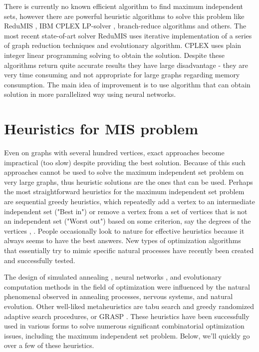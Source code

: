 There is currently no known efficient algorithm to find maximum independent sets, however there are powerful heuristic algorithms to solve this problem like ReduMIS \cite{redumis}, IBM CPLEX LP-solver \cite{CPLEX}, branch-reduce algorithms and others. The most recent state-of-art solver ReduMIS uses iterative implementation of a series of graph reduction techniques and evolutionary algorithm. CPLEX uses plain integer linear programming solving to obtain the solution. Despite these algorithms return quite accurate results they have large disadvantage - they are very time consuming and not appropriate for large graphs regarding memory consumption. 
The main idea of improvement is to use algorithm that can obtain solution in more parallelized way using neural networks.

\section{Heuristics for MIS problem}
Even on graphs with several hundred vertices, exact approaches become impractical (too slow) despite providing the best solution. Because of this such approaches cannot be used to solve the maximum independent set problem on very large graphs, thus heuristic solutions are the ones that can be used.
Perhaps the most straightforward heuristics for the maximum independent set problem are sequential greedy heuristics, which repeatedly add a vertex to an intermediate independent set ("Best in") or remove a vertex from a set of vertices that is not an independent set ("Worst out") based on some criterion, say the degrees of the vertices \cite{j74}, \cite{kr87}.
People occasionally look to nature for effective heuristics because it always seems to have the best answers. New types of optimization algorithms that essentially try to mimic specific natural processes have recently been created and successfully tested.

The design of simulated annealing \cite{kgv83}, neural networks \cite{h82}, and evolutionary computation \cite{h75} methods in the field of optimization were influenced by the natural phenomenal observed in annealing processes, nervous systems, and natural evolution. Other well-liked metaheuristics are tabu search \cite{gl97} and greedy randomized adaptive search procedures, or GRASP \cite{fr95}. These heuristics have been successfully used in various forms to solve numerous significant combinatorial optimization issues, including the maximum independent set problem. Below, we'll quickly go over a few of these heuristics.

